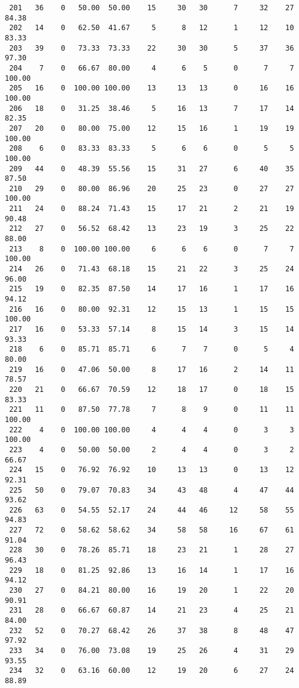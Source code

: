 \begin{verbatim}
 201   36    0   50.00  50.00    15     30   30      7     32    27    84.38
 202   14    0   62.50  41.67     5      8   12      1     12    10    83.33
 203   39    0   73.33  73.33    22     30   30      5     37    36    97.30
 204    7    0   66.67  80.00     4      6    5      0      7     7   100.00
 205   16    0  100.00 100.00    13     13   13      0     16    16   100.00
 206   18    0   31.25  38.46     5     16   13      7     17    14    82.35
 207   20    0   80.00  75.00    12     15   16      1     19    19   100.00
 208    6    0   83.33  83.33     5      6    6      0      5     5   100.00
 209   44    0   48.39  55.56    15     31   27      6     40    35    87.50
 210   29    0   80.00  86.96    20     25   23      0     27    27   100.00
 211   24    0   88.24  71.43    15     17   21      2     21    19    90.48
 212   27    0   56.52  68.42    13     23   19      3     25    22    88.00
 213    8    0  100.00 100.00     6      6    6      0      7     7   100.00
 214   26    0   71.43  68.18    15     21   22      3     25    24    96.00
 215   19    0   82.35  87.50    14     17   16      1     17    16    94.12
 216   16    0   80.00  92.31    12     15   13      1     15    15   100.00
 217   16    0   53.33  57.14     8     15   14      3     15    14    93.33
 218    6    0   85.71  85.71     6      7    7      0      5     4    80.00
 219   16    0   47.06  50.00     8     17   16      2     14    11    78.57
 220   21    0   66.67  70.59    12     18   17      0     18    15    83.33
 221   11    0   87.50  77.78     7      8    9      0     11    11   100.00
 222    4    0  100.00 100.00     4      4    4      0      3     3   100.00
 223    4    0   50.00  50.00     2      4    4      0      3     2    66.67
 224   15    0   76.92  76.92    10     13   13      0     13    12    92.31
 225   50    0   79.07  70.83    34     43   48      4     47    44    93.62
 226   63    0   54.55  52.17    24     44   46     12     58    55    94.83
 227   72    0   58.62  58.62    34     58   58     16     67    61    91.04
 228   30    0   78.26  85.71    18     23   21      1     28    27    96.43
 229   18    0   81.25  92.86    13     16   14      1     17    16    94.12
 230   27    0   84.21  80.00    16     19   20      1     22    20    90.91
 231   28    0   66.67  60.87    14     21   23      4     25    21    84.00
 232   52    0   70.27  68.42    26     37   38      8     48    47    97.92
 233   34    0   76.00  73.08    19     25   26      4     31    29    93.55
 234   32    0   63.16  60.00    12     19   20      6     27    24    88.89

\end{verbatim}
